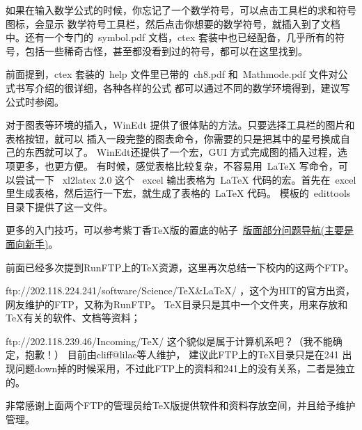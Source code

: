 如果在输入数学公式的时候，你忘记了一个数学符号，可以点击工具栏的求和符号图标，会显示
数学符号工具栏，然后点击你想要的数学符号，就插入到了文档中。还有一个专门的~symbol.pdf 文档，ctex
套装中也已经配备，几乎所有的符号，包括一些稀奇古怪，甚至都没看到过的符号，都可以在这里找到。

前面提到，ctex 套装的~help 文件里已带的~ch8.pdf 和~Mathmode.pdf 文件对公式书写介绍的很详细，各种各样的公式
都可以通过不同的数学环境得到，建议写公式时参阅。


对于图表等环境的插入，WinEdt 提供了很体贴的方法。只要选择工具栏的图片和表格按钮，就可以
插入一段完整的图表命令，你需要的只是把其中的星号换成自己的东西就可以了。
WinEdt还提供了一个宏，GUI 方式完成图的插入过程，选项更多，也更方便。
有时候，感觉表格比较复杂，不容易用~LaTeX 写命令，可以尝试一下 ~xl2latex 2.0 这个~ excel
输出表格为~LaTeX 代码的宏。首先在~excel 里生成表格，然后运行一下宏，就生成了表格的~LaTeX 代码。
模板的~edittools 目录下提供了这一文件。


更多的入门技巧，可以参考紫丁香TeX版的置底的帖子~\href{http://bbs.hit.edu.cn/bbscon.php?board=TeX&id=2038&ftype=11}{版面部分问题导航(主要是面向新手)}。

前面已经多次提到RunFTP上的TeX资源，这里再次总结一下校内的这两个FTP。
\begin{hitlist}
  \item ftp://202.118.224.241/software/Science/TeX\&LaTeX/  ，这个为HIT的官方出资，网友维护的FTP，又称为RunFTP。
  TeX目录只是其中一个文件夹，用来存放和TeX有关的软件、文档等资料；
  \item ftp://202.118.239.46/Incoming/TeX/  这个貌似是属于计算机系吧？（我不能确定，抱歉！） 目前由cliff@lilac等人维护，
建议此FTP上的TeX目录只是在241 出现问题down掉的时候采用，不过此FTP上的资料和241上的没有关系，二者是独立的。
\end{hitlist}

非常感谢上面两个FTP的管理员给TeX版提供软件和资料存放空间，并且给予维护管理。
